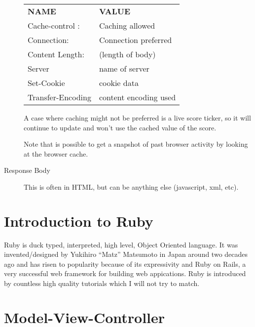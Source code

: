 \documentclass[11pt]{article}
\begin{document}
\begin{description}
\begin{tabular}{ l l }
  \textbf{NAME} & \textbf{VALUE}  \\
  Cache-control : & Caching allowed \\
  Connection: & Connection preferred \\
  Content Length: & (length of body) \\
  Server & name of server  \\
  Set-Cookie & cookie data  \\
  Transfer-Encoding & content encoding used  \\
\end{tabular}

A case where caching might not be preferred is a live score ticker, so it will continue to update and won’t use the cached value of the score.

Note that is possible to get a snapshot of past browser activity by looking at the browser cache.

\item[Response Body]
This is often in HTML, but can be anything else (javascript, xml, etc).
\end{description}


\section{Introduction to Ruby}
\label{sec:ruby}

Ruby is duck typed, interpreted, high level, Object Oriented language. It was invented/designed by Yukihiro ``Matz'' Matsumoto in Japan around two decades ago and has risen to popularity because of its expressivity and Ruby on Rails, a very successful web framework for building web appications. Ruby is introduced by countless high quality tutorials which I will not try to match.



\section{Model-View-Controller}
\label{sec:MVC}
\end{document}
